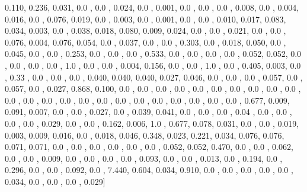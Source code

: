\documentclass[usenames,dvipsnames]{article} %
\begin{document}
0.110, 0.236, 0.031, 0.0  , 0.0  , 0.024, 0.0  , 0.001, 0.0  , 0.0  , 0.0  , 0.008, 0.0  , 0.004, 0.016, 0.0  , 0.076, 0.019, 0.0  , 0.003, 0.0  , 0.001, 0.0  , 0.0  , 0.010, 0.017, 0.083, 0.034, 0.003, 0.0  , 0.038, 0.018, 0.080, 0.009, 0.024, 0.0  , 0.0  , 0.021, 0.0  , 0.0  , 0.076, 0.004, 0.076, 0.054, 0.0  , 0.037, 0.0  , 0.0  , 0.303, 0.0  , 0.018, 0.050, 0.0  , 0.045, 0.0  , 0.0  , 0.253, 0.0  , 0.0  , 0.0  , 0.533, 0.0  , 0.0  , 0.0  , 0.0  , 0.052, 0.052, 0.0  , 0.0  , 0.0  , 0.0  , 1.0  , 0.0  , 0.0  , 0.004, 0.156, 0.0  , 0.0  , 1.0  , 0.0  , 0.405, 0.003, 0.0  , 0.33 , 0.0  , 0.0  , 0.0  , 0.040, 0.040, 0.040, 0.027, 0.046, 0.0  , 0.0  , 0.0  , 0.057, 0.0  , 0.057, 0.0  , 0.027, 0.868, 0.100, 0.0  , 0.0  , 0.0  , 0.0  , 0.0  , 0.0  , 0.0  , 0.0  , 0.0  , 0.0  , 0.0  , 0.0  , 0.0  , 0.0  , 0.0  , 0.0  , 0.0  , 0.0  , 0.0  , 0.0  , 0.0  , 0.0  , 0.0  , 0.677, 0.009, 0.091, 0.007, 0.0  , 0.0  , 0.027, 0.0  , 0.039, 0.041, 0.0  , 0.0  , 0.0  , 0.04 , 0.0  , 0.0  , 0.0  , 0.0  , 0.029, 0.0  , 0.0  , 0.162, 0.006, 1.0  , 0.677, 0.078, 0.031, 0.0  , 0.0  , 0.019, 0.003, 0.009, 0.016, 0.0  , 0.018, 0.046, 0.348, 0.023, 0.221, 0.034, 0.076, 0.076, 0.071, 0.071, 0.0  , 0.0  , 0.0  , 0.0  , 0.0  , 0.0  , 0.052, 0.052, 0.470, 0.0  , 0.0  , 0.062, 0.0  , 0.0  , 0.009, 0.0  , 0.0  , 0.0  , 0.0  , 0.093, 0.0  , 0.0  , 0.013, 0.0  , 0.194, 0.0  , 0.296, 0.0  , 0.0  , 0.092, 0.0  , 7.440, 0.604, 0.034, 0.910, 0.0  , 0.0  , 0.0  , 0.0  , 0.0  , 0.034, 0.0  , 0.0  , 0.0  , 0.029]
\end{document}
